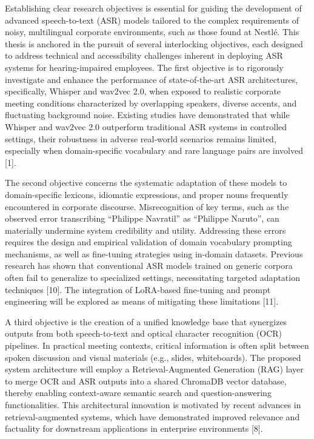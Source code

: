 \documentclass[12pt,a4paper]{article}
\begin{document}
Establishing clear research objectives is essential for guiding the development of advanced speech-to-text (ASR) models tailored to the complex requirements of noisy, multilingual corporate environments, such as those found at Nestlé. This thesis is anchored in the pursuit of several interlocking objectives, each designed to address technical and accessibility challenges inherent in deploying ASR systems for hearing-impaired employees. The first objective is to rigorously investigate and enhance the performance of state-of-the-art ASR architectures, specifically, Whisper and wav2vec 2.0, when exposed to realistic corporate meeting conditions characterized by overlapping speakers, diverse accents, and fluctuating background noise. Existing studies have demonstrated that while Whisper and wav2vec 2.0 outperform traditional ASR systems in controlled settings, their robustness in adverse real-world scenarios remains limited, especially when domain-specific vocabulary and rare language pairs are involved [1].


The second objective concerns the systematic adaptation of these models to domain-specific lexicons, idiomatic expressions, and proper nouns frequently encountered in corporate discourse. Misrecognition of key terms, such as the observed error transcribing “Philippe Navratil” as “Philippe Naruto”, can materially undermine system credibility and utility. Addressing these errors requires the design and empirical validation of domain vocabulary prompting mechanisms, as well as fine-tuning strategies using in-domain datasets. Previous research has shown that conventional ASR models trained on generic corpora often fail to generalize to specialized settings, necessitating targeted adaptation techniques [10]. The integration of LoRA-based fine-tuning and prompt engineering will be explored as means of mitigating these limitations [11].


A third objective is the creation of a unified knowledge base that synergizes outputs from both speech-to-text and optical character recognition (OCR) pipelines. In practical meeting contexts, critical information is often split between spoken discussion and visual materials (e.g., slides, whiteboards). The proposed system architecture will employ a Retrieval-Augmented Generation (RAG) layer to merge OCR and ASR outputs into a shared ChromaDB vector database, thereby enabling context-aware semantic search and question-answering functionalities. This architectural innovation is motivated by recent advances in retrieval-augmented systems, which have demonstrated improved relevance and factuality for downstream applications in enterprise environments [8].
\end{document}
